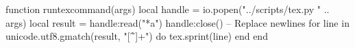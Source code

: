 \begin{luacode*}
	function runtexcommand(args)
	local handle = io.popen("../scripts/tex.py " .. args)
	local result = handle:read("*a")
	handle:close()
	-- Replace newlines
	for line in unicode.utf8.gmatch(result, "[^\r\n]+") do
	tex.sprint(line)
	end
	end
\end{luacode*}
\newcommand\runtex[1]{\directlua{runtexcommand([[#1]])}}
